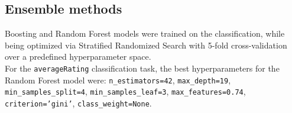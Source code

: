 


\subsection{Ensemble methods}
Boosting and Random Forest models were trained on the classification,
while being optimized via Stratified Randomized Search with 5-fold
cross-validation over a predefined hyperparameter space.\\








For the \texttt{averageRating} classification task, the best
hyperparameters for the Random Forest model were:
\texttt{n\_estimators=42}, \texttt{max\_depth=19}, \texttt{min\_samples\_split=4},
\texttt{min\_samples\_leaf=3}, \texttt{max\_features=0.74},
\texttt{criterion='gini'}, \texttt{class\_weight=None}.

